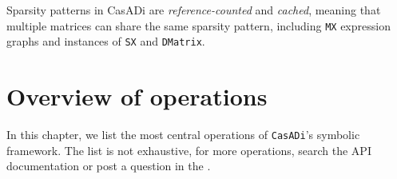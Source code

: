 \documentclass[a4paper,12pt]{book}
\newcommand{\CasADi}{\texttt{CasADi}\xspace}
\begin{document}
Sparsity patterns in CasADi are \emph{reference-counted} and \emph{cached}, meaning that multiple matrices can share the same sparsity pattern, including \texttt{MX} expression graphs and instances of \texttt{SX} and \texttt{DMatrix}.

\chapter{Overview of operations}
In this chapter, we list the most central operations of \CasADi's symbolic framework. The list is not exhaustive, for more operations, search the API documentation or post a question in the .

\end{document}
